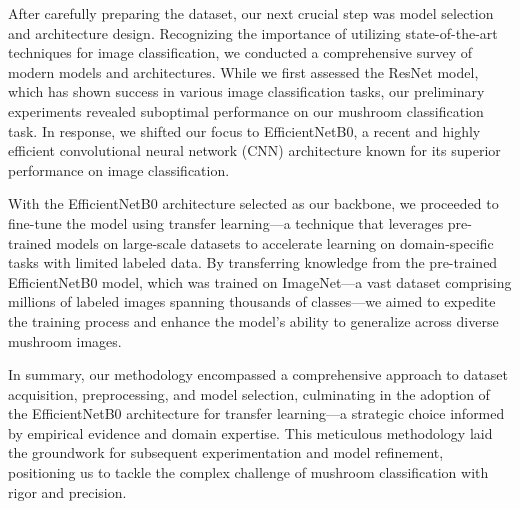 After carefully preparing the dataset, our next crucial step was model selection and architecture design. Recognizing the importance of utilizing state-of-the-art techniques for image classification, we conducted a comprehensive survey of modern models and architectures. While we first assessed the ResNet model, which has shown success in various image classification tasks, our preliminary experiments revealed suboptimal performance on our mushroom classification task. In response, we shifted our focus to EfficientNetB0, a recent and highly efficient convolutional neural network (CNN) architecture known for its superior performance on image classification.

With the EfficientNetB0 architecture selected as our backbone, we proceeded to fine-tune the model using transfer learning—a technique that leverages pre-trained models on large-scale datasets to accelerate learning on domain-specific tasks with limited labeled data. By transferring knowledge from the pre-trained EfficientNetB0 model, which was trained on ImageNet—a vast dataset comprising millions of labeled images spanning thousands of classes—we aimed to expedite the training process and enhance the model's ability to generalize across diverse mushroom images.

In summary, our methodology encompassed a comprehensive approach to dataset acquisition, preprocessing, and model selection, culminating in the adoption of the EfficientNetB0 architecture for transfer learning—a strategic choice informed by empirical evidence and domain expertise. This meticulous methodology laid the groundwork for subsequent experimentation and model refinement, positioning us to tackle the complex challenge of mushroom classification with rigor and precision.